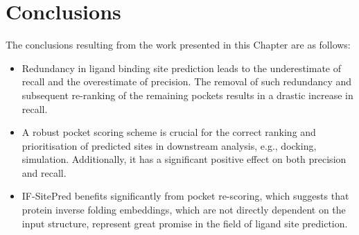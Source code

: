 \section{Conclusions}

The conclusions resulting from the work presented in this Chapter are as follows:

\begin{itemize}

\item Redundancy in ligand binding site prediction leads to the underestimate of recall and the overestimate of precision. The removal of such redundancy and subsequent re-ranking of the remaining pockets results in a drastic increase in recall.

\item A robust pocket scoring scheme is crucial for the correct ranking and prioritisation of predicted sites in downstream analysis, e.g., docking, simulation. Additionally, it has a significant positive effect on both precision and recall.

\item IF-SitePred benefits significantly from pocket re-scoring, which suggests that protein inverse folding embeddings, which are not directly dependent on the input structure, represent great promise in the field of ligand site prediction.

\end{itemize}

